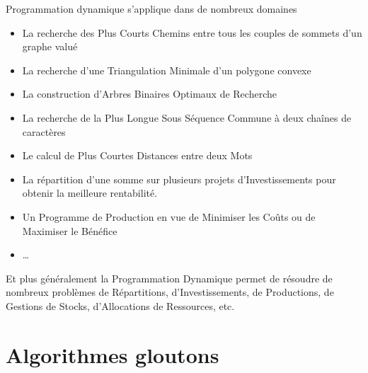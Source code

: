 \documentclass[aspectratio=1610,francais,envcountsect]{beamer}
\begin{document}
\begin{frame}{Programmation dynamique s’applique dans de nombreux
    domaines}

  \begin{itemize}
  \item La recherche des Plus Courts Chemins entre tous les couples de
    sommets d’un graphe valué
  \item La recherche d’une Triangulation Minimale d’un polygone
    convexe
  \item La construction d’Arbres Binaires Optimaux de Recherche
  \item La recherche de la Plus Longue Sous Séquence Commune à deux
    chaînes de caractères
  \item Le calcul de Plus Courtes Distances entre deux Mots
  \item La répartition d’une somme sur plusieurs projets
    d’Investissements pour obtenir la meilleure rentabilité.
  \item Un Programme de Production en vue de Minimiser les Coûts ou de
    Maximiser le Bénéfice
  \item \ldots
  \end{itemize}

  Et plus généralement la Programmation Dynamique permet de résoudre
  de nombreux problèmes de Répartitions, d’Investissements, de
  Productions, de Gestions de Stocks, d’Allocations de Ressources,
  etc.

\end{frame}

\section{Algorithmes gloutons}
\end{document}
